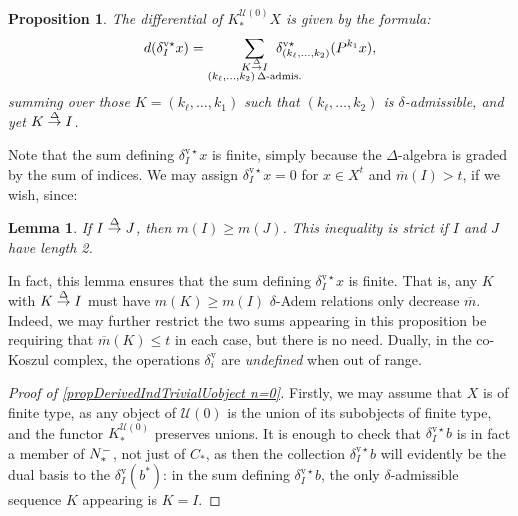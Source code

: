 \documentclass[11pt]{amsart} \renewcommand{\baselinestretch}{1.2}
\theoremstyle{plain}
\newtheorem{lem}[thm]{Lemma}
\newtheorem{prop}[thm]{Proposition}
\theoremstyle{definition}
\newcommand{\calU}{\mathcal{U}}
\newcommand{\deltaalg}{\Delta} %
\newcommand{\minDimP}{\overline{m}}
\newcommand{\minDimDelta}{m}
\newcommand{\produces}[3]{#3:#1\sim #2}
\renewcommand{\produces}[3]{#1\rightarrow_{#3} #2}%
\renewcommand{\produces}[3]{#1\overset{\smash{#3}}{\rightarrow} #2}%
\newcommand{\Nop}{N^{\smash{-}}}
\newcommand{\uver}{^\mathrm{v}}
\newcommand{\deltav}{\delta\uver}
\newcommand{\deltavstar}{\delta^{\mathrm{v}\star}}
\begin{document}
\begin{Koszul complexes}
\begin{prop}
The differential of $K^{\calU(0)}_*X$ is given by the formula:
\[d(\deltavstar_Ix)=\sum_{ \substack{\produces{K}{I}{\deltaalg}\\(k_{\ell},\ldots,k_2){\,\deltaalg\textup{-admis.}}}}\!\!\!\!\!\!\!\!\!\!\!\! \deltavstar_{(k_{\ell},\ldots,k_2)}(P^{k_1}x),\]
summing over those $K=(k_{\ell},\ldots,k_1)$ such that $(k_{\ell},\ldots,k_2)$ is $\delta$-admissible, and yet $\produces{K}{I}{\deltaalg}$.
\end{prop}
Note that the sum defining $\deltavstar_Ix$ is finite, simply because the $\Delta$-algebra is graded by the sum of indices.
We may assign $\deltavstar_Ix=0$ for $x\in X^t$ and $\minDimP(I)>t$, if we wish, since:
\begin{lem}
\label{lemOnAdemChangeIn minDimP}
If $\produces{I}{J}{\deltaalg}$, then $\minDimDelta(I)\geq\minDimDelta(J)$. This inequality is strict if $I$ and $J$ have length 2.
\end{lem}
\noindent In fact, this lemma ensures that the sum defining $\deltavstar_Ix$ is finite. That is, any $K$ with $\produces{K}{I}{\Delta}$ must have  $\minDimDelta(K)\geq\minDimDelta(I)$
 $\delta$-Adem relations only decrease $\minDimP$. Indeed, we may further restrict the two sums appearing in this proposition be requiring that $\minDimP(K)\leq t$ in each case, but there is no need. Dually, in the co-Koszul complex, the operations $\deltav_i$ are \emph{undefined} when out of range.
\begin{proof}[Proof of \ref{propDerivedIndTrivialUobject n=0}]
Firstly, we may assume that $X$ is  of finite type, as any object of $\calU(0)$ is the union of its  subobjects of finite type, and the functor $K_*^{\calU(0)}$ preserves unions. It is enough to check that $\deltavstar_Ib$ is in fact a member of $\Nop_*$, not just of $C_*$, as then the collection $\deltavstar_Ib$ will evidently be the dual basis to the $\deltav_I(b^*)$: in the sum defining $\deltavstar_Ib$, the only $\delta$-admissible sequence $K$ appearing is $K=I$.  %


\end{proof}
\end{Koszul complexes}
\end{document}
